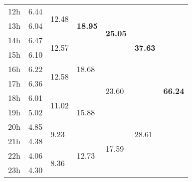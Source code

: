 \documentclass[10pt]{beamer}
\begin{document}
\begin{frame}
\begin{minipage}[t]{0.48\linewidth}
\begin{table}
\begin{center}
\begin{tabular}{| p{.2cm} || p{.37cm} | p{.37cm} | p{.37cm} | p{.37cm} | p{.37cm} | p{.37cm} |}
 12h  &\multirow{1}{*}{6.44 }   &\multirow{2}{*}{12.48 }   &\multirow{3}{*}{\textbf{18.95}}   &\multirow{4}{*}{\textbf{25.05\;}}&\multirow{6}{*}{\textbf{37.63}}   &\multirow{12}{*}{\textbf{66.24}}  \\\cline{2-2} 
 13h  &\multirow{1}{*}{6.04 }   &   &   &   &   &  \\\cline{2-2}\cline{3-3} 
 14h  &\multirow{1}{*}{6.47 }   &\multirow{2}{*}{12.57 }   &   &   &   &  \\\cline{2-2}\cline{4-4} 
 15h  &\multirow{1}{*}{6.10 }   &   &\multirow{3}{*}{18.68 }   &   &   &  \\\cline{2-2}\cline{3-3}\cline{5-5} 
 16h  &\multirow{1}{*}{6.22 }   &\multirow{2}{*}{12.58 }   &   &\multirow{4}{*}{23.60 }   &   &  \\\cline{2-2} 
 17h  &\multirow{1}{*}{6.36 }   &   &   &   &   &  \\\cline{2-2}\cline{3-3}\cline{4-4}\cline{6-6} 
 18h  &\multirow{1}{*}{6.01 }   &\multirow{2}{*}{11.02 }   &\multirow{3}{*}{15.88 }   &   &\multirow{6}{*}{28.61 }   &  \\\cline{2-2} 
 19h  &\multirow{1}{*}{5.02 }   &   &   &   &   &  \\\cline{2-2}\cline{3-3}\cline{5-5} 
 20h  &\multirow{1}{*}{4.85 }   &\multirow{2}{*}{9.23 }   &   &\multirow{4}{*}{17.59 }   &   &  \\\cline{2-2}\cline{4-4} 
 21h  &\multirow{1}{*}{4.38 }   &   &\multirow{3}{*}{12.73 }   &   &   &  \\\cline{2-2}\cline{3-3} 
 22h  &\multirow{1}{*}{4.06 }   &\multirow{2}{*}{8.36 }   &   &   &   &  \\\cline{2-2} 
 23h & \multirow{1}{*}{4.30 }  & & & & & \\\cline{2-2}\cline{3-3}\cline{4-4}\cline{5-5}\cline{6-6}\cline{7-7} 
 \hline\end{tabular} 
 \end{center}
\end{table}



\end{minipage}
\end{frame}
\end{document}
